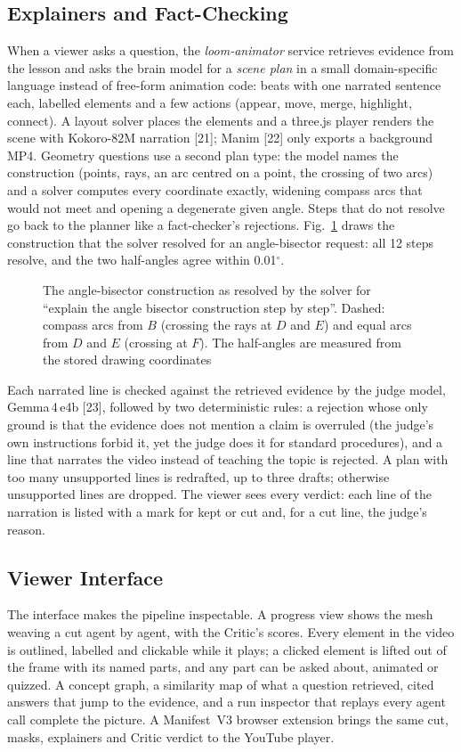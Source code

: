 \documentclass[9pt,a4paper]{extarticle}
\newcommand{\fig}[1]{Fig.~\ref{#1}}
\begin{document}
\subsection{Explainers and Fact-Checking}
When a viewer asks a question, the \emph{loom-animator} service retrieves evidence from the lesson and asks the brain
model for a \emph{scene plan} in a small domain-specific language instead of free-form animation code: beats with one
narrated sentence each, labelled elements and a few actions (appear, move, merge, highlight, connect). A layout solver
places the elements and a three.js player renders the scene with Kokoro-82M narration [21]; Manim [22] only exports a
background MP4. Geometry questions use a second plan type: the model names the construction (points, rays, an arc
centred on a point, the crossing of two arcs) and a solver computes every coordinate exactly, widening compass arcs that
would not meet and opening a degenerate given angle. Steps that do not resolve go back to the planner like a
fact-checker's rejections. \fig{fig:construct} draws the construction that the solver resolved for an angle-bisector
request: all 12 steps resolve, and the two half-angles agree within 0.01$^\circ$.

\begin{figure}[t]
\centering

\caption{The angle-bisector construction as resolved by the solver for ``explain the angle bisector construction step
by step''. Dashed: compass arcs from $B$ (crossing the rays at $D$ and $E$) and equal arcs from $D$ and $E$ (crossing at
$F$). The half-angles are measured from the stored drawing coordinates}
\label{fig:construct}
\end{figure}

Each narrated line is checked against the retrieved evidence by the judge model, Gemma\,4\,e4b [23], followed by two
deterministic rules: a rejection whose only ground is that the evidence does not mention a claim is overruled (the
judge's own instructions forbid it, yet the judge does it for standard procedures), and a line that narrates the video
instead of teaching the topic is rejected. A plan with too many unsupported lines is redrafted, up to three drafts;
otherwise unsupported lines are dropped. The viewer sees every verdict: each line of the narration is listed with a
mark for kept or cut and, for a cut line, the judge's reason.

\subsection{Viewer Interface}
The interface makes the pipeline inspectable. A progress view shows the mesh weaving a cut agent by agent, with the
Critic's scores. Every element in the video is outlined, labelled and clickable while it plays; a clicked element is
lifted out of the frame with its named parts, and any part can be asked about, animated or quizzed. A concept graph, a
similarity map of what a question retrieved, cited answers that jump to the evidence, and a run inspector that replays
every agent call complete the picture. A Manifest~V3 browser extension brings the same cut, masks, explainers and
Critic verdict to the YouTube player.
\end{document}
